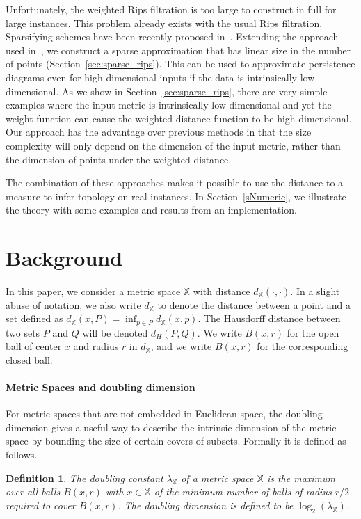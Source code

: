 \documentclass[a4paper]{article}
\newcommand\X{\mathbb{X}}
\newcommand\dX[2]{d_\X(#1,#2)}
\newtheorem{definition}[theorem]{Definition}
\begin{document}
Unfortunately, the weighted Rips filtration is too large to construct in full for large instances.
This problem already exists with the usual Rips filtration.
Sparsifying schemes have been recently proposed in~\cite{ctpsmDFW,lsavrfS}.
Extending the approach used in~\cite{lsavrfS}, we construct a sparse approximation that has linear size in the number of points (Section~\ref{sec:sparse_rips}).
This can be used to approximate persistence diagrams even for high dimensional inputs if the data is intrinsically low dimensional.
As we show in Section~\ref{sec:sparse_rips}, there are very simple examples where the input metric is intrinsically low-dimensional and yet the weight function can cause the weighted distance function to be high-dimensional.  
Our approach has the advantage over previous methods in that the size complexity will only depend on the dimension of the input metric, rather than the dimension of points under the weighted distance.

The combination of these approaches makes it possible to use the distance to a measure to infer topology on real instances.
In Section~\ref{sNumeric}, we illustrate the theory with some examples and results from an implementation.








\section{Background} In this paper, we consider a metric space $\X$ with distance $\dX{\cdot}{\cdot}$.
In a slight abuse of notation, we also write $d_\X$ to denote the distance between a point and a set defined as $\dX{x}{P}=\inf_{p\in P}\dX{x}{p}$.
The Hausdorff distance between two sets $P$ and $Q$ will be denoted $d_H(P,Q)$.
We write $B(x,r)$ for the open ball of center $x$ and radius $r$ in $d_\X$, and we write $\bar{B}(x,r)$ for the corresponding closed ball.

\paragraph{Metric Spaces and doubling dimension}
For metric spaces that are not embedded in Euclidean space, the doubling dimension gives a useful way to describe the intrinsic dimension of the metric space by bounding the size of certain covers of subsets.
Formally it is defined as follows.

\begin{definition}\label{def:doubling_dimension}
  The \emph{doubling constant} $\lambda_{\X}$ of a metric space $\X$ is the maximum over all balls $B(x,r)$ with $x\in\X$ of the minimum number of balls of radius $r/2$ required to cover $B(x,r)$.
  The \emph{doubling dimension} is defined to be $\log_2(\lambda_{\X})$.
\end{definition}
\end{document}
